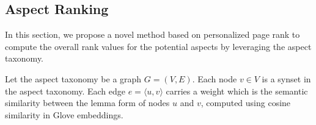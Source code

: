 \subsection{Aspect Ranking}
\label{sec:rank}
In this section, we propose a novel
method based on personalized page rank 
to compute the overall rank values
for the potential aspects by leveraging the aspect taxonomy.


Let the aspect taxonomy be a graph $G=(V, E)$.
Each node $v\in V$ is a synset in the aspect taxonomy.
Each edge $e = \langle u, v \rangle$ carries a weight which is
the semantic similarity between the lemma form of nodes $u$ and $v$,
computed using cosine similarity in Glove embeddings.
%	
%

